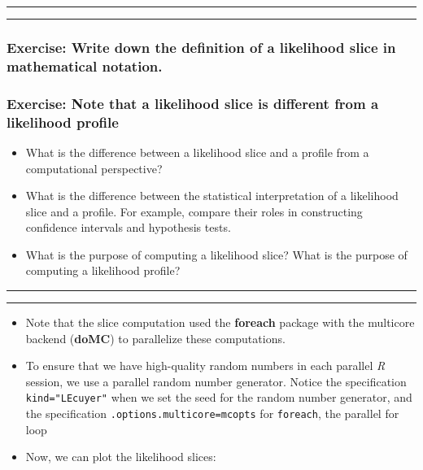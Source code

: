 \documentclass[]{article}
\begin{document}
\begin{center}\rule{0.5\linewidth}{\linethickness}\end{center}

\begin{center}\rule{0.5\linewidth}{\linethickness}\end{center}

\subsubsection{Exercise: Write down the definition of a likelihood slice
in mathematical
notation.}\label{exercise-write-down-the-definition-of-a-likelihood-slice-in-mathematical-notation.}

\subsubsection{Exercise: Note that a likelihood slice is different from
a likelihood
profile}\label{exercise-note-that-a-likelihood-slice-is-different-from-a-likelihood-profile}

\begin{itemize}
\item
  What is the difference between a likelihood slice and a profile from a
  computational perspective?
\item
  What is the difference between the statistical interpretation of a
  likelihood slice and a profile. For example, compare their roles in
  constructing confidence intervals and hypothesis tests.
\item
  What is the purpose of computing a likelihood slice? What is the
  purpose of computing a likelihood profile?
\end{itemize}

\begin{center}\rule{0.5\linewidth}{\linethickness}\end{center}

\begin{center}\rule{0.5\linewidth}{\linethickness}\end{center}

\begin{itemize}
\item
  Note that the slice computation used the \textbf{foreach} package with
  the multicore backend (\textbf{doMC}) to parallelize these
  computations.
\item
  To ensure that we have high-quality random numbers in each parallel
  \emph{R} session, we use a parallel random number generator. Notice
  the specification \texttt{kind="L\textquotesingle{}Ecuyer"} when we
  set the seed for the random number generator, and the specification
  \texttt{.options.multicore=mcopts} for \texttt{foreach}, the parallel
  for loop
\item
  Now, we can plot the likelihood slices:
\end{itemize}
\end{document}

